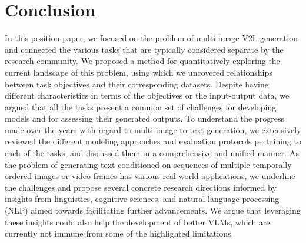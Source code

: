 \section{Conclusion}
In this position paper, we focused on the problem of multi-image V2L generation and connected the various tasks that are typically considered separate by the research community. We proposed a method for quantitatively exploring the current landscape of this problem, using which we uncovered relationships between task objectives and their corresponding datasets. Despite having different characteristics in terms of the objectives or the input-output data, we argued that all the tasks present a common set of challenges for developing models and for assessing their generated outputs. To understand the progress made over the years with regard to multi-image-to-text generation, we extensively reviewed the different modeling approaches and evaluation protocols pertaining to each of the tasks, and discussed them in a comprehensive and unified manner. As the problem of generating text conditioned on sequences of multiple temporally ordered images or video frames has various real-world applications, we underline the challenges and propose several concrete research directions informed by insights from linguistics, cognitive sciences, and natural language processing (NLP) aimed towards facilitating further advancements. We argue that leveraging these insights could also help the development of better VLMs, which are currently not immune from some of the highlighted limitations.